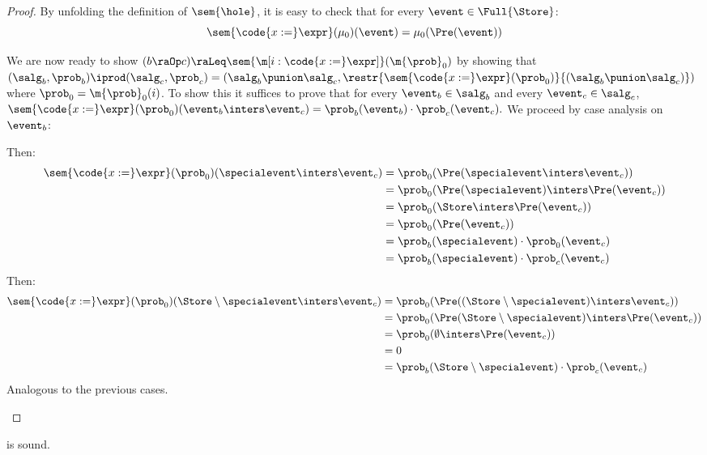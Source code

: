 \documentclass[acmsmall,nonacm,screen,appendix]{acmart}
\begin{document}
\begin{proof}
  By unfolding the definition of $\sem{\hole}$,
  it is easy to check that for every $\event \in \Full{\Store}$:
  \[
    \sem{\code{x:=}\expr}(\mu_0)(\event) = \mu_0(\Pre(\event))
  \]

  We are now ready to show
  $(b \raOp c) \raLeq \sem{\m[i: \code{x:=}\expr]}(\m{\prob}_0)$
  by showing that
  $
    (\salg_b,\prob_b)\iprod(\salg_c,\prob_c)
    =
    (\salg_b \punion \salg_c,
     \restr{\sem{\code{x:=}\expr}(\prob_0)}{(\salg_b \punion \salg_c)})
  $
  where $\prob_0 = \m{\prob}_0(i)$.
  To show this it suffices to prove that
  for every $\event_b \in \salg_b$ and every $\event_c \in \salg_c$,
  $
    \sem{\code{x:=}\expr}(\prob_0)(\event_b \inters \event_c)
    = \prob_b(\event_b) \cdot \prob_c(\event_c).
  $
  We proceed by case analysis on $\event_b$:
  \begin{casesplit}
  \case[$\event_b = \specialevent$]
    Then:
    \begin{align*}
      \sem{\code{x:=}\expr}(\prob_0)(\specialevent \inters \event_c)
        &= \prob_0(\Pre(\specialevent \inters \event_c))
      \\&= \prob_0(\Pre(\specialevent) \inters \Pre(\event_c))
      \\&= \prob_0(\Store \inters \Pre(\event_c))
      \\&= \prob_0(\Pre(\event_c))
      \\&= \prob_b(\specialevent) \cdot \prob_0(\event_c)
      \\&= \prob_b(\specialevent) \cdot \prob_c(\event_c)
    \end{align*}
  \case[$\event_b = \Store \setminus \specialevent$]
    Then:
    \begin{align*}
      \sem{\code{x:=}\expr}(\prob_0)
          (\Store \setminus \specialevent \inters \event_c)
        &= \prob_0(\Pre((\Store \setminus \specialevent) \inters \event_c))
      \\&= \prob_0(\Pre(\Store \setminus \specialevent) \inters \Pre(\event_c))
      \\&= \prob_0(\emptyset \inters \Pre(\event_c))
      \\&= 0
      \\&= \prob_b(\Store \setminus \specialevent) \cdot \prob_c(\event_c)
    \end{align*}
  \case[$\event_b = \Store$ or $\event_b = \emptyset$]
    Analogous to the previous cases.
    \qedhere
  \end{casesplit}
\end{proof}
 \begin{lemma}
\label{proof:wp-samp}
   is sound.
\end{lemma}
\end{document}
